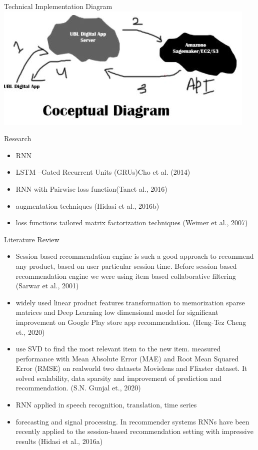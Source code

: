 \documentclass{beamer}
\begin{document}
\begin{frame}{Technical Implementation Diagram}
    \includegraphics[width=\textwidth]{conceptual diagram.JPG}
\end{frame}

\begin{frame}{Research}
    \begin{itemize}
        \item RNN
        \item LSTM –Gated Recurrent Units (GRUs)Cho et al. (2014)
        \item RNN with Pairwise loss function(Tanet al., 2016)
        \item augmentation techniques (Hidasi et al., 2016b)
        \item loss functions tailored matrix factorization techniques (Weimer et al., 2007)

    \end{itemize}
\end{frame}


\begin{frame}{Literature Review}
\begin{itemize}
    \item Session based recommendation engine is such a good approach to recommend any product, based on user particular session time. Before session based recommendation engine we were using item based collaborative filtering (Sarwar et al., 2001)
    \item widely used linear product features transformation to memorization sparse matrices and Deep Learning low dimensional model for significant improvement on Google Play store app recommendation. (Heng-Tez Cheng et., 2020)
    \item use SVD to find the most relevant item to the new item. measured performance with Mean Absolute Error (MAE) and Root Mean Squared Error (RMSE) on realworld two datasets Movielens and Flixster dataset. It solved scalability, data sparsity and improvement of prediction and recommendation. (S.N. Gunjal et., 2020)
    \item RNN applied in speech recognition, translation, time series
    \item forecasting and signal processing. In recommender systems RNNs have been recently applied to the session-based recommendation setting with impressive results (Hidasi et al., 2016a)
\end{itemize}

\end{frame}
\end{document}
